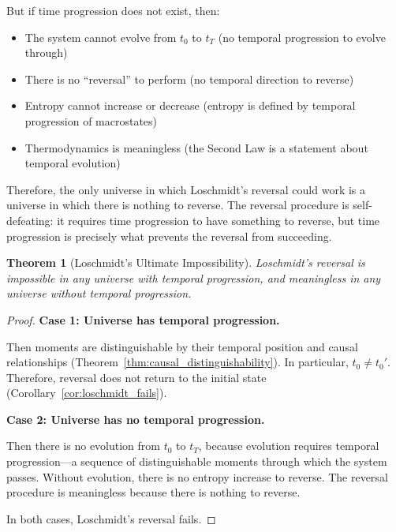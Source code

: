 \documentclass[twocolumn,10pt]{article}
\newtheorem{theorem}{Theorem}[section]
\theoremstyle{definition}
\theoremstyle{remark}
\begin{document}
\noindent But if time progression does not exist, then:
\begin{itemize}
\item The system cannot evolve from $t_0$ to $t_T$ (no temporal progression to evolve through)
\item There is no ``reversal'' to perform (no temporal direction to reverse)
\item Entropy cannot increase or decrease (entropy is defined by temporal progression of macrostates)
\item Thermodynamics is meaningless (the Second Law is a statement about temporal evolution)
\end{itemize}

\noindent Therefore, the only universe in which Loschmidt's reversal could work is a universe in which there is nothing to reverse. The reversal procedure is self-defeating: it requires time progression to have something to reverse, but time progression is precisely what prevents the reversal from succeeding.

\begin{theorem}[Loschmidt's Ultimate Impossibility]
\label{thm:ultimate_impossibility}
Loschmidt's reversal is impossible in any universe with temporal progression, and meaningless in any universe without temporal progression.
\end{theorem}

\begin{proof}
\textbf{Case 1: Universe has temporal progression.}

Then moments are distinguishable by their temporal position and causal relationships (Theorem~\ref{thm:causal_distinguishability}). In particular, $t_0 \neq t_0'$. Therefore, reversal does not return to the initial state (Corollary~\ref{cor:loschmidt_fails}).

\vspace{0.2cm}
\noindent\textbf{Case 2: Universe has no temporal progression.}

Then there is no evolution from $t_0$ to $t_T$, because evolution requires temporal progression—a sequence of distinguishable moments through which the system passes. Without evolution, there is no entropy increase to reverse. The reversal procedure is meaningless because there is nothing to reverse.

\vspace{0.2cm}
\noindent In both cases, Loschmidt's reversal fails.
\end{proof}
\end{document}
